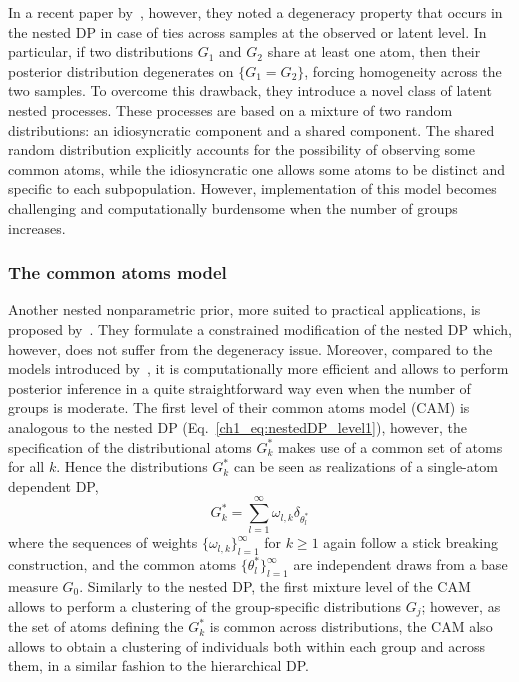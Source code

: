 In a recent paper by~\textcite{camerlenghi2019}, however, they noted a degeneracy property that occurs in the nested DP in case of  ties across samples at the observed or latent level.
In particular, if two distributions $G_1$ and $G_2$ share at least one atom, then their posterior distribution degenerates on
$\{G_1=G_2\}$, forcing homogeneity across the two samples. 
To overcome this drawback, they introduce a novel class of latent nested processes.
These processes are based on a mixture of two random distributions: an idiosyncratic component and a shared component. 
The shared random distribution explicitly accounts for the possibility of observing some common atoms, while the idiosyncratic one
allows some atoms to be distinct and specific to each subpopulation.
However, implementation of this model becomes challenging and computationally burdensome when the number of groups increases.

\subsubsection*{The common atoms model}
Another nested nonparametric prior, more suited to practical applications, is proposed by~\textcite{denti2021}. They formulate a constrained modification of the nested DP which, however, does not suffer from the degeneracy issue. Moreover, compared to the models introduced by~\textcite{camerlenghi2019}, it is computationally more efficient and allows to perform posterior inference in a quite straightforward way even when the number of groups is moderate.
%
The first level of their common atoms model (CAM) is analogous to the nested DP (Eq.~\ref{ch1_eq:nestedDP_level1}), however, the specification of the distributional atoms $G^*_k$ makes use of a common set of atoms for all $k$. Hence the distributions $G^*_k$ can be seen as realizations of a single-atom dependent DP,
\begin{equation*}
G^*_k = \sum_{l=1}^{\infty} \omega_{l,k} \delta_{\theta^*_{l}} 
\end{equation*}
where the sequences of weights $\{\omega_{l,k}\}_{l=1}^{\infty}$ for $k\geq1$ again follow a stick breaking construction, and the common atoms $\{\theta^*_l\}_{l=1}^{\infty}$ are independent draws from a base measure $G_0$.
Similarly to the nested DP, the first mixture level of the CAM allows to perform a clustering of the group-specific distributions $G_j$; however, as the set of atoms defining the $G^*_k$ is common across distributions, the CAM also allows to obtain a clustering of individuals both within each group and across them, in a similar fashion to the hierarchical DP.


